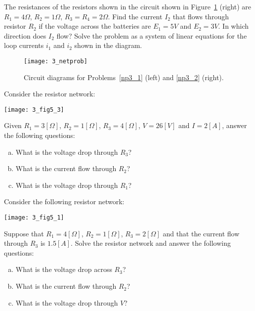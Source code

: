 \begin{problem}
\label{np3_2}
The resistances of the resistors shown in the circuit shown in 
Figure~\ref{fig_netprob} (right) are 
$R_1 = 4 \Omega$, $R_2 = 1 \Omega$, $R_3 = R_4 = 2 \Omega$. Find the 
current $I_2$ that flows through resistor $R_2$ if the voltage across 
the batteries are $E_1 = 5V$ and $E_2 = 3V$. In which direction 
does $I_2$ flow? Solve the problem as a system of linear equations 
for the loop currents $i_1$ and $i_2$ shown in the diagram. 
\end{problem}

\begin{figure}
\centerline{\texttt{[image: 3\_netprob]}}
\caption{Circuit diagrams for Problems~\ref{np3_1} (left) and 
\ref{np3_2} (right). 
\label{fig_netprob}}
\end{figure}

\begin{problem}
\label{2009_a5_3}
Consider the resistor network:

\begin{center}
\texttt{[image: 3\_fig5\_3]}
\end{center}
Given $R_1=3[\Omega]$, $R_2=1[\Omega]$, $R_3=4[\Omega]$, $V=26[V]$ and $I=2[A]$, answer the following questions:
\begin{enumerate}[a)]
\item What is the voltage drop through $R_3$?
\item What is the current flow through $R_2$?
\item What is the voltage drop through $R_1$?
\end{enumerate}
\end{problem}

\begin{problem}
\label{2009_a5_4}
Consider the following resistor network:

\begin{center}
\texttt{[image: 3\_fig5\_1]}
\end{center}
Suppose that $R_1=4[\Omega]$, $R_2=1[\Omega]$, $R_3=2[\Omega]$ and that the current flow through $R_3$ is $1.5[A]$. Solve the resistor network and answer the following questions:
\begin{enumerate}[a)]
\item What is the voltage drop across $R_3$?
\item What is the current flow through $R_2$?
\item What is the voltage drop through $V$?
\end{enumerate}
\end{problem}

